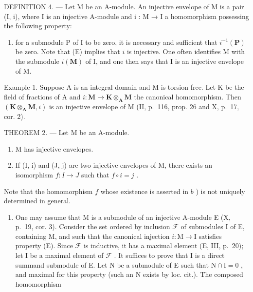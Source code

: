 DEFINITION 4. --- Let M be an A-module. An injective envelope of M is a pair (I, i), where I is an injective A-module and i : M → I a homomorphism possessing the following property:

\begin{enumerate}
\def\labelenumi{(\Alph{enumi})}
\setcounter{enumi}{4}
\tightlist
\item
  for a submodule P of I to be zero, it is necessary and sufficient that \(i^{-1}(\mathbf{P})\) be zero. Note that (E) implies that \(i\) is injective. One often identifies M with the submodule \(i(\mathbf{M})\) of I, and one then says that I is an injective envelope of M.
\end{enumerate}

Example 1. Suppose A is an integral domain and M is torsion-free. Let K be the field of fractions of A and \(i: \mathbf{M} \to \mathbf{K} \otimes_{\mathbf{A}} \mathbf{M}\) the canonical homomorphism. Then \((\mathbf{K} \otimes_{\mathbf{A}} \mathbf{M}, i)\) is an injective envelope of M (II, p.~116, prop. 26 and X, p.~17, cor. 2).

THEOREM 2. --- Let M be an A-module.

\begin{enumerate}
\def\labelenumi{\alph{enumi})}
\item
  M has injective envelopes.
\item
  If (I, i) and (J, j) are two injective envelopes of M, there exists an isomorphism \(f: I \to J\) such that \(f \circ i = j\) .
\end{enumerate}

Note that the homomorphism \(f\) whose existence is asserted in \(b\) ) is not uniquely determined in general.

\begin{enumerate}
\def\labelenumi{\alph{enumi})}
\tightlist
\item
  One may assume that M is a submodule of an injective A-module E (X, p.~19, cor. 3). Consider the set ordered by inclusion \(\mathcal{F}\) of submodules I of E, containing M, and such that the canonical injection \(i: \mathrm{M} \to \mathrm{I}\) satisfies property (E). Since \(\mathcal{F}\) is inductive, it has a maximal element (E, III, p.~20); let I be a maximal element of \(\mathcal{F}\) . It suffices to prove that I is a direct summand submodule of E. Let N be a submodule of E such that \(\mathrm{N} \cap \mathrm{I} = 0\) , and maximal for this property (such an N exists by loc. cit.). The composed homomorphism
\end{enumerate}

